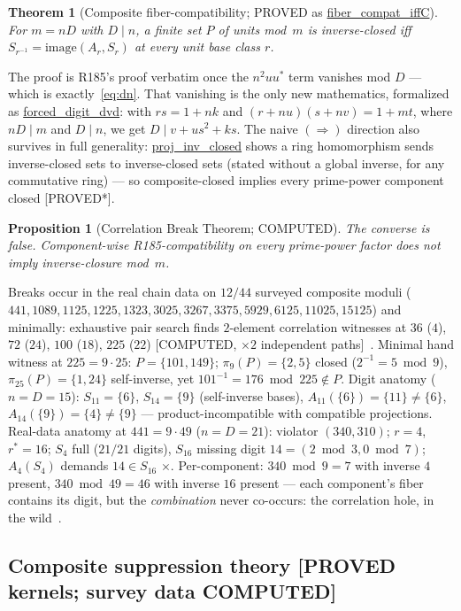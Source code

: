 \documentclass[11pt,a4paper]{article}
\newtheorem{theorem}{Theorem}
\newtheorem{proposition}{Proposition}
\theoremstyle{definition}
\begin{document}
\begin{theorem}[Composite fiber-compatibility; PROVED as
  \url{fiber_compat_iffC}]
  \label{thm:composite}
  For $m=nD$ with $D\mid n$, a finite set $P$ of units mod~$m$ is
  inverse-closed iff $S_{r^{-1}}=\mathrm{image}(A_r,S_r)$ at every unit
  base class $r$.
\end{theorem}
The proof is R185's proof verbatim once the $n^2uu^*$ term vanishes mod
$D$ --- which is exactly~\eqref{eq:dn}. That vanishing is the only new
mathematics, formalized as \url{forced_digit_dvd}: with
$rs=1+nk$ and $(r+nu)(s+nv)=1+mt$, where $nD\mid m$ and $D\mid n$, we get
$D\mid v+us^2+ks$. The naive $(\Rightarrow)$ direction also survives in
full generality: \url{proj_inv_closed} shows a ring homomorphism
sends inverse-closed sets to inverse-closed sets (stated without a
global inverse, for any commutative ring) --- so composite-closed
implies every prime-power component closed [PROVED*].

\begin{proposition}[Correlation Break Theorem; COMPUTED]
  \label{prop:break}
  The converse is false. Component-wise R185-compatibility on every
  prime-power factor does \emph{not} imply inverse-closure mod~$m$.
\end{proposition}
Breaks occur in the real chain data on $12/44$ surveyed composite moduli
($441,1089,1125,1225,1323,3025,3267,3375,5929,6125,11025,15125$) and
minimally: exhaustive pair search finds $2$-element correlation witnesses
at $36$ ($4$), $72$ ($24$), $100$ ($18$), $225$ ($22$) [COMPUTED,
$\times2$ independent paths]~\cite{D192}. Minimal hand witness at
$225=9\cdot25$: $P=\{101,149\}$; $\pi_9(P)=\{2,5\}$ closed
($2^{-1}=5\bmod9$), $\pi_{25}(P)=\{1,24\}$ self-inverse, yet
$101^{-1}=176\bmod225\notin P$. Digit anatomy ($n=D=15$):
$S_{11}=\{6\}$, $S_{14}=\{9\}$ (self-inverse bases),
$A_{11}(\{6\})=\{11\}\ne\{6\}$, $A_{14}(\{9\})=\{4\}\ne\{9\}$ ---
product-incompatible with compatible projections. Real-data anatomy at
$441=9\cdot49$ ($n=D=21$): violator $(340,310)$; $r=4$, $r^*=16$;
$S_4$ full ($21/21$ digits), $S_{16}$ missing digit $14=(2\bmod3,
0\bmod7)$; $A_4(S_4)$ demands $14\in S_{16}$ $\times$. Per-component:
$340\bmod9=7$ with inverse $4$ present, $340\bmod49=46$ with inverse
$16$ present --- each component's fiber contains its digit, but the
\emph{combination} never co-occurs: the correlation hole, in the
wild~\cite{D192}.

\subsection{Composite suppression theory [PROVED kernels; survey data COMPUTED]}
\end{document}
